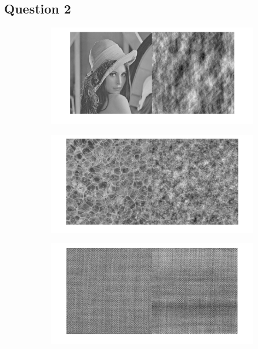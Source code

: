 \documentclass[12pt,a4paper,onecolumn]{article}
\begin{document}
\subsection{Question 2}

\begin{figure}[H]
	\centering
	\begin{subfigure}[b]{\textwidth}
		\centering
		\includegraphics[height = 0.20\textheight]{10_2_lena}
		\label{10_2_lena}
	\end{subfigure}
	\begin{subfigure}[b]{\textwidth}
		\centering
		\includegraphics[height = 0.20\textheight]{10_2_bulles}
		\label{10_2_bulles}
	\end{subfigure}
	\begin{subfigure}[b]{\textwidth}
		\centering
		\includegraphics[height = 0.20\textheight]{10_2_tissu}

\end{subfigure}
\end{figure}
\end{document}
